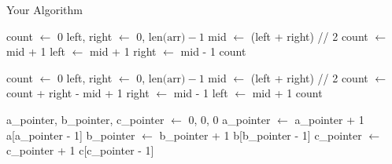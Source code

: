 \documentclass{article}
\begin{document}
\begin{algorithm}
\caption{Your Algorithm}
\begin{algorithmic}[1]

        \State count $\gets$ 0
        \State left, right $\gets$ 0, $\text{len(arr)} - 1$
            \State mid $\gets$ (left + right) // 2
                \State count $\gets$ mid + 1
                \State left $\gets$ mid + 1
            \Else
                \State right $\gets$ mid - 1
            \EndIf
        \EndWhile
        \State \Return count
    \EndFunction

        \State count $\gets$ 0
        \State left, right $\gets$ 0, $\text{len(arr)} - 1$
            \State mid $\gets$ (left + right) // 2
                \State count $\gets$ count + right - mid + 1
                \State right $\gets$ mid - 1
            \Else
                \State left $\gets$ mid + 1
            \EndIf
        \EndWhile
        \State \Return count
    \EndFunction

        \State a\_pointer, b\_pointer, c\_pointer $\gets$ 0, 0, 0
                \State a\_pointer $\gets$ a\_pointer + 1
                    \State \Return a[a\_pointer - 1]
                \EndIf
                \State b\_pointer $\gets$ b\_pointer + 1
                    \State \Return b[b\_pointer - 1]
                \EndIf
                \State c\_pointer $\gets$ c\_pointer + 1
                    \State \Return c[c\_pointer - 1]
                \EndIf
            \EndIf
        \EndWhile
    \EndFunction
    
\end{algorithmic}
\end{algorithm}
\end{document}
